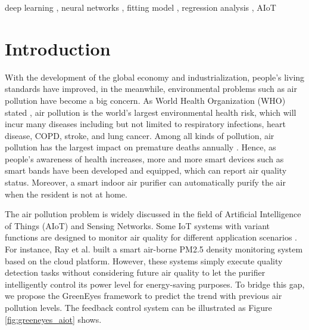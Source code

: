 \documentclass[
twocolumn,
]{ceurart}
\begin{document}
\begin{keywords}
  deep learning \sep
  neural networks \sep
  fitting model \sep
  regression analysis \sep
  AIoT
\end{keywords}

\maketitle

\section{Introduction}

With the development of the global economy and industrialization, people's living standards have improved, in the meanwhile, environmental problems such as air pollution have become a big concern. As World Health Organization (WHO) stated \cite{world2016ambient}, air pollution is the world's largest environmental health risk, which will incur many diseases including but not limited to respiratory infections, heart disease, COPD, stroke, and lung cancer. Among all kinds of pollution, air pollution has the largest impact on premature deaths annually \cite{lelieveld2015contribution}. Hence, as people's awareness of health increases, more and more smart devices such as smart bands have been developed and equipped, which can report air quality status. Moreover, a smart indoor air purifier can automatically purify the air when the resident is not at home.

The air pollution problem is widely discussed in the field of Artificial Intelligence of Things (AIoT) and Sensing Networks. Some IoT systems with variant functions are designed to monitor air quality for different application scenarios \cite{kumar2017air, oh2015indoor, zheng2016design}. For instance, Ray et al. \cite{ray2016internet} built a smart air-borne PM2.5 density monitoring system based on the cloud platform. However, these systems simply execute quality detection tasks without considering future air quality to let the purifier intelligently control its power level for energy-saving purposes. To bridge this gap, we propose the GreenEyes framework to predict the trend with previous air pollution levels. The feedback control system can be illustrated as Figure \ref{fig:greeneyes_aiot} shows.
\end{document}
